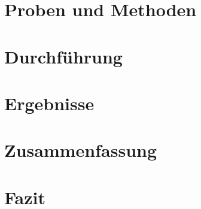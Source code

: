 \documentclass[12pt,a4paper,ngerman,captions=tableheading]{scrartcl}
\begin{document}

%


\section{Proben und Methoden}


\clearpage
\section{Durchführung}




\section{Ergebnisse}



\clearpage
\section{Zusammenfassung}



\section{Fazit}



\end{document}
